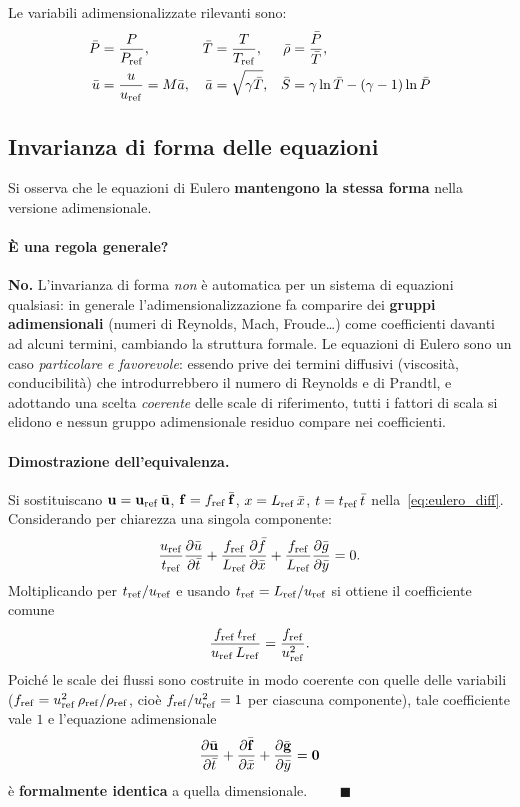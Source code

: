 Le variabili adimensionalizzate rilevanti sono:
\begin{align}
  \bar{P} &= \frac{P}{P_{\rm ref}}, &
  \bar{T} &= \frac{T}{T_{\rm ref}}, &
  \bar{\rho} &= \frac{\bar{P}}{\bar{T}}, \\
  \bar{u} &= \frac{u}{u_{\rm ref}} = M \bar{a}, &
  \bar{a} &= \sqrt{\gamma \bar{T}}, &
  \bar{S} &= \gamma \ln \bar{T} - (\gamma-1)\ln \bar{P}
\end{align}

\subsection{Invarianza di forma delle equazioni}

Si osserva che le equazioni di Eulero \textbf{mantengono la stessa forma} nella
versione adimensionale.

\paragraph{È una regola generale?}
\textbf{No.} L'invarianza di forma \emph{non} è automatica per un sistema di equazioni
qualsiasi: in generale l'adimensionalizzazione fa comparire dei \textbf{gruppi
adimensionali} (numeri di Reynolds, Mach, Froude\dots) come coefficienti davanti ad
alcuni termini, cambiando la struttura formale. Le equazioni di Eulero sono un caso
\emph{particolare e favorevole}: essendo prive dei termini diffusivi (viscosità,
conducibilità) che introdurrebbero il numero di Reynolds e di Prandtl, e adottando una
scelta \emph{coerente} delle scale di riferimento, tutti i fattori di scala si elidono
e nessun gruppo adimensionale residuo compare nei coefficienti.

\paragraph{Dimostrazione dell'equivalenza.}
Si sostituiscano $\mathbf{u} = \mathbf{u}_{\rm ref}\,\bar{\mathbf{u}}$, $\mathbf{f} = f_{\rm ref}\,\bar{\mathbf{f}}$,
$x = L_{\rm ref}\,\bar{x}$, $t = t_{\rm ref}\,\bar{t}$ nella~\eqref{eq:eulero_diff}.
Considerando per chiarezza una singola componente:
\begin{equation*}
  \frac{u_{\rm ref}}{t_{\rm ref}}\dfrac{\partial \bar{u}}{\partial \bar t}
  + \frac{f_{\rm ref}}{L_{\rm ref}}\dfrac{\partial \bar f}{\partial \bar x}
  + \frac{f_{\rm ref}}{L_{\rm ref}}\dfrac{\partial \bar g}{\partial \bar y} = 0 .
\end{equation*}
Moltiplicando per $t_{\rm ref}/u_{\rm ref}$ e usando $t_{\rm ref} = L_{\rm ref}/u_{\rm ref}$
si ottiene il coefficiente comune
\[
  \frac{f_{\rm ref}\,t_{\rm ref}}{u_{\rm ref}\,L_{\rm ref}}
  = \frac{f_{\rm ref}}{u_{\rm ref}^2}.
\]
Poiché le scale dei flussi sono costruite in modo coerente con quelle delle variabili
($f_{\rm ref} = u_{\rm ref}^2\,\rho_{\rm ref}/\rho_{\rm ref}$, cioè
$f_{\rm ref}/u_{\rm ref}^2 = 1$ per ciascuna componente), tale coefficiente vale $1$ e
l'equazione adimensionale
\[
  \dfrac{\partial \bar{\mathbf{u}}}{\partial \bar t}
  + \dfrac{\partial \bar{\mathbf{f}}}{\partial \bar x}
  + \dfrac{\partial \bar{\mathbf{g}}}{\partial \bar y} = \bm{0}
\]
è \textbf{formalmente identica} a quella dimensionale. $\qquad\blacksquare$

